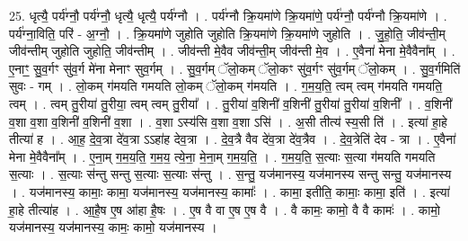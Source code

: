 \documentclass[17pt]{extarticle}
\begin{document}
25. धृत्यै॒ पर्य॑ग्नौ॒ पर्य॑ग्नौ॒ धृत्यै॒ धृत्यै॒ पर्य॑ग्नौ । . पर्य॑ग्नौ क्रि॒यमा॑णे क्रि॒यमा॑णे॒ पर्य॑ग्नौ॒ पर्य॑ग्नौ क्रि॒यमा॑णे । . पर्य॑ग्ना॒विति॒ परि॑ - अ॒ग्नौ॒ । . क्रि॒यमा॑णे जुहोति जुहोति क्रि॒यमा॑णे क्रि॒यमा॑णे जुहोति । . जु॒हो॒ति॒ जीव॑न्ती॒म् जीव॑न्तीम् जुहोति जुहोति॒ जीव॑न्तीम् । . जीव॑न्ती मे॒वैव जीव॑न्ती॒म् जीव॑न्ती मे॒व । . ए॒वैना॑ मेना मे॒वैवैना᳚म् । . ए॒नाꣳ॒॒ सु॒व॒र्गꣳ सु॑व॒र्ग मे॑ना मेनाꣳ सुव॒र्गम् । . सु॒व॒र्गम् ॅलो॒कम् ॅलो॒कꣳ सु॑व॒र्गꣳ सु॑व॒र्गम् ॅलो॒कम् । . सु॒व॒र्गमिति॑ सुवः - गम् । . लो॒कम् ग॑मयति गमयति लो॒कम् ॅलो॒कम् ग॑मयति । . ग॒म॒य॒ति॒ त्वम् त्वम् ग॑मयति गमयति॒ त्वम् । . त्वम् तु॒रीया॑ तु॒रीया॒ त्वम् त्वम् तु॒रीया᳚ । . तु॒रीया॑ व॒शिनी॑ व॒शिनी॑ तु॒रीया॑ तु॒रीया॑ व॒शिनी᳚ । . व॒शिनी॑ व॒शा व॒शा व॒शिनी॑ व॒शिनी॑ व॒शा । . व॒शा ऽस्य॑सि व॒शा व॒शा ऽसि॑ । . अ॒सी तीत्य॑ स्य॒सी ति॑ । . इत्या॑ हा॒हे तीत्या॑ ह । . आ॒ह॒ दे॒व॒त्रा दे॑व॒त्रा ऽऽहा॑ह देव॒त्रा । . दे॒व॒त्रै वैव दे॑व॒त्रा दे॑व॒त्रैव । . दे॒व॒त्रेति॑ देव - त्रा । . ए॒वैना॑ मेना मे॒वैवैना᳚म् । . ए॒ना॒म् ग॒म॒य॒ति॒ ग॒म॒य॒ त्ये॒ना॒ मे॒ना॒म् ग॒म॒य॒ति॒ । . ग॒म॒य॒ति॒ स॒त्याः स॒त्या ग॑मयति गमयति स॒त्याः । . स॒त्याः स॑न्तु सन्तु स॒त्याः स॒त्याः स॑न्तु । . स॒न्तु॒ यज॑मानस्य॒ यज॑मानस्य सन्तु सन्तु॒ यज॑मानस्य । . यज॑मानस्य॒ कामाः॒ कामा॒ यज॑मानस्य॒ यज॑मानस्य॒ कामाः᳚ । . कामा॒ इतीति॒ कामाः॒ कामा॒ इति॑ । . इत्या॑ हा॒हे तीत्या॑ह । . आ॒है॒ष ए॒ष आ॑हा है॒षः । . ए॒ष वै वा ए॒ष ए॒ष वै । . वै कामः॒ कामो॒ वै वै कामः॑ । . कामो॒ यज॑मानस्य॒ यज॑मानस्य॒ कामः॒ कामो॒ यज॑मानस्य । \newline
\end{document}
